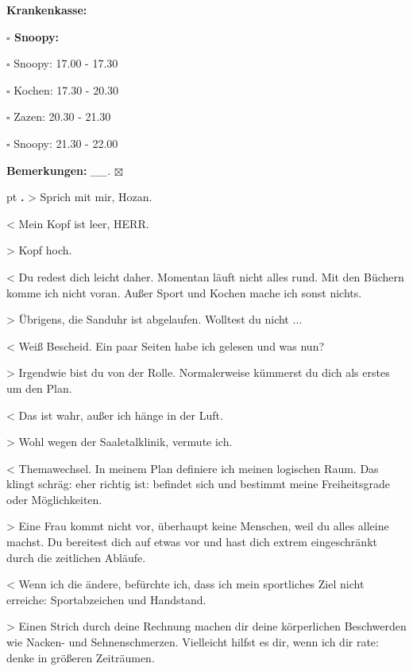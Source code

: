 \documentclass[10pt,a4paper]{article}
\newcounter{notec}
\newcommand\notep[1]{%
  \stepcounter{notec}
  \vskip #1pt
  {\bf\arabic{notec}.}
}
\newcommand\prop[1] {{\color {alizarin} {\bf #1}}}             %
\newcommand\mand[1] {{\color {burntorange} {\bf #1}}}          %
\newcommand\bottomspace{\vskip 4pt}
\newcommand\n[1] { {\sl #1.} \hskip 5pt }
\begin{document}
\begin{mdframed}[style=daystyle]
\begin{labeling}{{\mand {Krankenkasse:}}}
\begin{minipage}{0.75\textwidth}
\begin{labeling}{\prop {$\square$ {Snoopy:}}}
        
      \item[$\square$ Snoopy:] 17.00 - 17.30
      \item[$\square$ Kochen:] 17.30 - 20.30
        
      \item[$\square$ Zazen:]  20.30 - 21.30
      \item[$\square$ Snoopy:] 21.30 - 22.00
      \end{labeling}
    \end{minipage}
    \bottomspace
  \item[{\mand {Bemerkungen:}}]  \n{\_\_} $\boxtimes$
  \end{labeling}
    
  \setcounter{notec}{0}
  
  \notep 0 > Sprich mit mir, Hozan.

  \vskip 2pt
  < Mein Kopf ist leer, HERR.

  \vskip 2pt
  > Kopf hoch.

  \vskip 2pt
  < Du redest dich leicht daher. Momentan läuft nicht alles rund. Mit den
  Büchern komme ich nicht voran. Außer Sport und Kochen mache ich sonst nichts.

  \vskip 2pt
  > Übrigens, die Sanduhr ist abgelaufen. Wolltest du nicht $\ldots$

  \vskip 2pt
  < Weiß Bescheid. Ein paar Seiten habe ich gelesen und was nun?

  \vskip 2pt
  > Irgendwie bist du von der Rolle. Normalerweise kümmerst du dich als erstes
  um den Plan.

  \vskip 2pt
  < Das ist wahr, außer ich hänge in der Luft.

  \vskip 2pt
  > Wohl wegen der Saaletalklinik, vermute ich.

  \vskip 2pt
  < Themawechsel. In meinem Plan definiere ich meinen logischen Raum. Das klingt
  schräg: eher richtig ist: befindet sich und bestimmt meine Freiheitsgrade oder
  Möglichkeiten.

  \vskip 2pt
  > Eine Frau kommt nicht vor, überhaupt keine Menschen, weil du alles alleine
  machst. Du bereitest dich auf etwas vor und hast dich extrem eingeschränkt
  durch die zeitlichen Abläufe.

  \vskip 2pt
  < Wenn ich die ändere, befürchte ich, dass ich mein sportliches Ziel nicht
  erreiche: Sportabzeichen und Handstand.

  \vskip 2pt
  > Einen Strich durch deine Rechnung machen dir deine körperlichen Beschwerden
  wie Nacken- und Sehnenschmerzen. Vielleicht hilfst es dir, wenn ich dir rate:
  denke in größeren Zeiträumen.


\end{mdframed}
\end{document}

